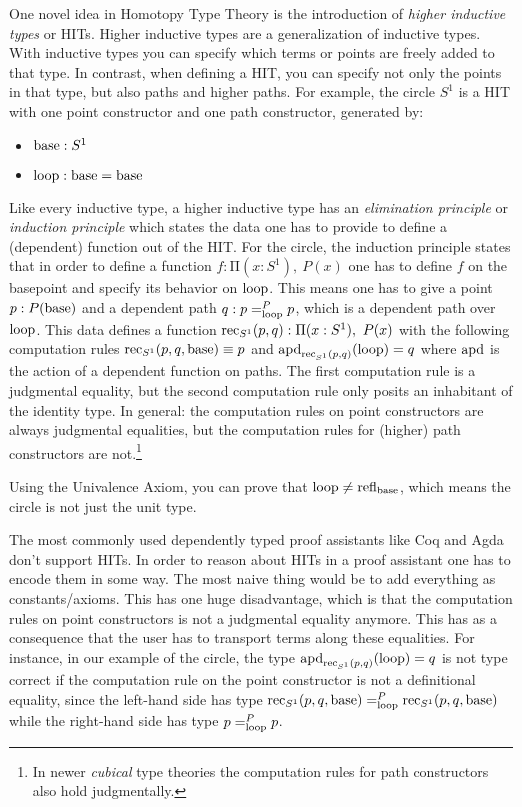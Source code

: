\documentclass{llncs}
\newcommand{\fa}[2]{\ensuremath{\mathrm{\Pi}(#1),\ #2}}
\newcommand{\myapd}{\textnormal{apd}}
\newcommand{\base}{\textnormal{base}}
\newcommand{\lp}{\textnormal{loop}}
\newcommand{\rec}{\textnormal{rec}}
\newcommand{\refl}{\textnormal{refl}}
\begin{document}
One novel idea in Homotopy Type Theory is the introduction of \emph{higher inductive types} or
HITs. Higher inductive types are a generalization of inductive types. With inductive types you can
specify which terms or points are freely added to that type. In contrast, when defining a HIT, you
can specify not only the points in that type, but also paths and higher paths. For example, the
circle $S^1$ is a HIT with one point constructor and one path constructor, generated by:
\begin{itemize}
  \item $\base : S^1$
  \item $\lp : \base = \base$
\end{itemize}
Like every inductive type, a higher inductive type has an \emph{elimination principle} or
\emph{induction principle} which states the data one has to provide to define a (dependent) function
out of the HIT. For the circle, the induction principle states that in order to define a function $f
: \fa{x : S^1}{P(x)}$ one has to define $f$ on the basepoint and specify its behavior on $\lp$. This
means one has to give a point $p : P(\base)$ and a dependent path $q : p =_\lp^Pp$, which is a
dependent path over $\lp$. This data defines a function $\rec_{S^1}(p,q) : \fa{x : S^1}{P(x)}$ with
the following computation rules $\rec_{S^1}(p,q,\base)\equiv p$ and
$\myapd_{\rec_{S^1}(p,q)}(\lp)=q$ where $\myapd$ is the action of a dependent function on paths. The
first computation rule is a judgmental equality, but the second computation rule only posits an
inhabitant of the identity type. In general: the computation rules on point constructors are always
judgmental equalities, but the computation rules for (higher) path constructors are not.\footnote{In
  newer \emph{cubical} type theories the computation rules for path constructors also hold
  judgmentally.\cite{cohen2015cubical}}

Using the Univalence Axiom, you can prove that $\lp \neq \refl_\base$, which means the circle is not
just the unit type.

The most commonly used dependently typed proof assistants like Coq and Agda don't support HITs. In
order to reason about HITs in a proof assistant one has to encode them in some way. The most naive
thing would be to add everything as constants/axioms. This has one huge disadvantage, which is that
the computation rules on point constructors is not a judgmental equality anymore. This has as a
consequence that the user has to transport terms along these equalities. For instance, in our
example of the circle, the type $\myapd_{\rec_{S^1}(p,q)}(\lp)=q$ is not type correct if the
computation rule on the point constructor is not a definitional equality, since the left-hand side
has type $\rec_{S^1}(p,q,\base) =_\lp^P \rec_{S^1}(p,q,\base)$ while the right-hand side has type $p
=_\lp^Pp$.
\end{document}
